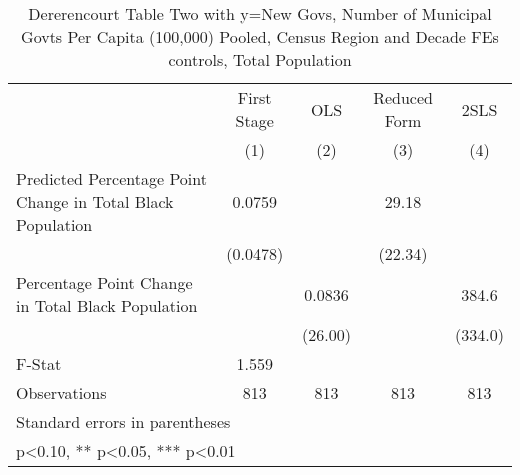 \begin{table}[htbp]\centering
\def\sym#1{\ifmmode^{#1}\else\(^{#1}\)\fi}
\caption{Dererencourt Table Two with y=New Govs, Number of Municipal Govts Per Capita (100,000) Pooled, Census Region and Decade FEs controls, Total Population}
\begin{tabular}{l*{4}{c}}
\toprule
                    & First Stage   &         OLS   &Reduced Form   &        2SLS   \\
                    &\multicolumn{1}{c}{(1)}   &\multicolumn{1}{c}{(2)}   &\multicolumn{1}{c}{(3)}   &\multicolumn{1}{c}{(4)}   \\
\midrule
Predicted Percentage Point Change in Total Black Population&      0.0759   &               &       29.18   &               \\
                    &    (0.0478)   &               &     (22.34)   &               \\
\addlinespace
Percentage Point Change in Total Black Population&               &      0.0836   &               &       384.6   \\
                    &               &     (26.00)   &               &     (334.0)   \\
\midrule
F-Stat              &       1.559   &               &               &               \\
Observations        &         813   &         813   &         813   &         813   \\
\bottomrule
\multicolumn{5}{l}{\footnotesize Standard errors in parentheses}\\
\multicolumn{5}{l}{\footnotesize * p<0.10, ** p<0.05, *** p<0.01}\\
\end{tabular}
\end{table}
